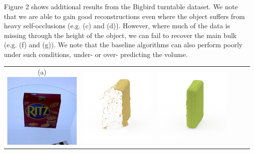 \documentclass[10pt,onecolumn,letterpaper]{article}
\begin{document}
Figure 2 shows additional results from the Bigbird turntable dataset. 
We note that we are able to gain good reconstructions even where the object suffers from heavy self-occlusions  (e.g. (c) and (d)).
However, where much of the data is missing through the height of the object, we can fail to recover the main bulk (e.g. (f) and (g)).
We note that the baseline algorithms can also perform poorly under such conditions, under- or over- predicting the volume.

\newcommand{\turnheight}{0.12\columnwidth}
\vspace{15pt}


\begin{tabular}{cccccc}
(a) \includegraphics[height=\turnheight, clip=true, trim=20 30 30 5]{ritz_crackers.png} &
\includegraphics[height=\turnheight, clip=true, trim=60 30 30 5]{ritz_crackers_NP3_0_visible_pixels_view_180.png} &
\includegraphics[height=\turnheight, clip=true, trim=60 30 30 5]{ritz_crackers_NP3_0_gt_view_180.png} &

\end{tabular}
\end{document}
